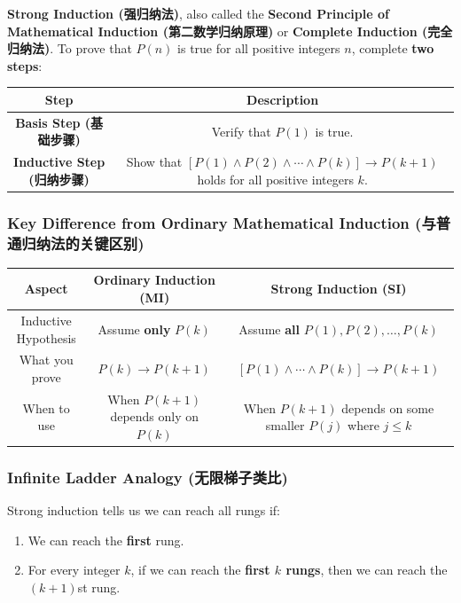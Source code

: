 \documentclass[10pt,a4paper,openany]{ctexbook}
\theoremstyle{definition}
\theoremstyle{remark}
\begin{document}
\textbf{Strong Induction (强归纳法)}, also called the \textbf{Second Principle of Mathematical Induction (第二数学归纳原理)} or \textbf{Complete Induction (完全归纳法)}.
To prove that $P(n)$ is true for all positive integers $n$, complete \textbf{two steps}:
\begin{center}
\begin{tabular}{cc}
\hline
Step & Description \\ \hline
\textbf{Basis Step (基础步骤)} & Verify that $P(1)$ is true. \\
\textbf{Inductive Step (归纳步骤)} & Show that $[P(1) \land P(2) \land \cdots \land P(k)] \to P(k+1)$ holds for all positive integers $k$. \\
\hline
\end{tabular}

\end{center}

\subsubsection{Key Difference from Ordinary Mathematical Induction (与普通归纳法的关键区别)}

\begin{center}
\begin{tabular}{ccc}
\hline
Aspect & Ordinary Induction (MI) & Strong Induction (SI) \\ \hline
Inductive Hypothesis & Assume \textbf{only} $P(k)$ & Assume \textbf{all} $P(1), P(2), \dots, P(k)$ \\
What you prove & $P(k) \to P(k+1)$ & $[P(1) \land \cdots \land P(k)] \to P(k+1)$ \\
When to use & When $P(k+1)$ depends only on $P(k)$ & When $P(k+1)$ depends on some smaller $P(j)$ where $j \le k$ \\
\hline
\end{tabular}

\end{center}

\subsubsection{Infinite Ladder Analogy (无限梯子类比)}

Strong induction tells us we can reach all rungs if:
\begin{enumerate}
\item We can reach the \textbf{first} rung.
\item For every integer $k$, if we can reach the \textbf{first $k$ rungs}, then we can reach the $(k+1)$st rung.

\end{enumerate}
\end{document}
